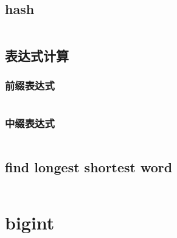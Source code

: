 \documentclass[a4paper,11pt]{article}
\begin{document}
\subsection{hash}
\inputminted[breaklines]{c++}{string/hash.cpp}
\subsection{表达式计算}
\subsubsection{前缀表达式}
\inputminted[breaklines]{c++}{string/pre_expr.cpp}

\subsubsection{中缀表达式}
\inputminted[breaklines]{c++}{string/post_expr.cpp}
\subsection{find longest shortest word}
\inputminted[breaklines]{c++}{string/find_longest_shortest_word.cpp}

\section{bigint}
\inputminted[breaklines]{c++}{bigint/bigint.cpp}
\end{document}
